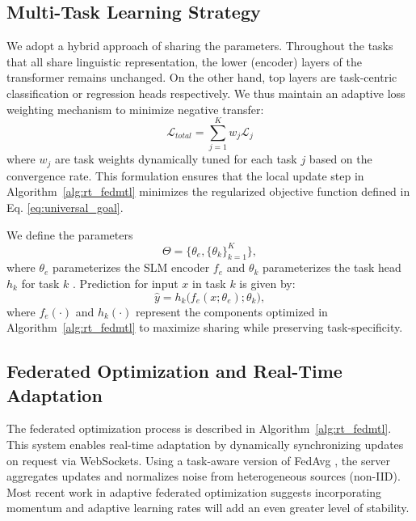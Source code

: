 \subsection{Multi-Task Learning Strategy}
We adopt a hybrid approach of sharing the parameters. Throughout the tasks that all share linguistic representation, the lower (encoder) layers of the transformer remains unchanged. On the other hand, top layers are task-centric classification or regression heads respectively. We thus maintain an adaptive loss weighting mechanism to minimize negative transfer:
\begin{equation} \label{eq:total_multi_task_loss}
    \mathcal{L}_{total} = \sum_{j=1}^{K} w_j \mathcal{L}_j
\end{equation}
where $w_j$ are task weights dynamically tuned for each task $j$ based on the convergence rate. This formulation ensures that the local update step in Algorithm~\ref{alg:rt_fedmtl} minimizes the regularized objective function defined in Eq. \eqref{eq:universal_goal}.

We define the parameters
\begin{equation} \label{eq:parameter_set}
    \Theta = \{\theta_e, \{\theta_k\}_{k=1}^{K}\},
\end{equation}
where $\theta_e$ parameterizes the SLM encoder $f_e$ and $\theta_k$ parameterizes the task head $h_k$ for task $k$ \cite{chen2024fedbone,zhou2025multi}. Prediction for input $x$ in task $k$ is given by:
\begin{equation} \label{eq:prediction_head}
    \hat{y} = h_k\big(f_e(x;\theta_e);\theta_k\big),
\end{equation}
where $f_e(\cdot)$ and $h_k(\cdot)$ represent the components optimized in Algorithm~\ref{alg:rt_fedmtl} to maximize sharing while preserving task-specificity.

\subsection{Federated Optimization and Real-Time Adaptation}
The federated optimization process is described in Algorithm~\ref{alg:rt_fedmtl}. This system enables real-time adaptation by dynamically synchronizing updates on request via WebSockets. Using a task-aware version of FedAvg \cite{mcmahan2017communication}, the server aggregates updates and normalizes noise from heterogeneous sources (non-IID). Most recent work in adaptive federated optimization \cite{reddi2020adaptive} suggests incorporating momentum and adaptive learning rates will add an even greater level of stability.

